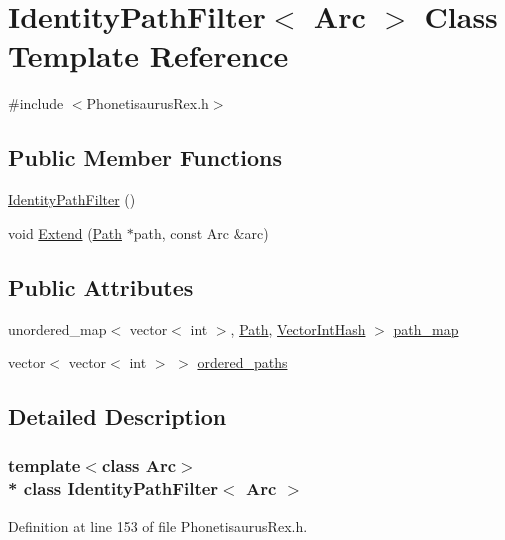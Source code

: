 \hypertarget{class_identity_path_filter}{}\section{Identity\+Path\+Filter$<$ Arc $>$ Class Template Reference}
\label{class_identity_path_filter}


{\ttfamily \#include $<$Phonetisaurus\+Rex.\+h$>$}

\subsection*{Public Member Functions}
\begin{DoxyCompactItemize}
\item 
\hyperlink{class_identity_path_filter_ad3798c4949207eb14477c2c6d4746e51}{Identity\+Path\+Filter} ()
\item 
void \hyperlink{class_identity_path_filter_a3c9d3935c06834a421d6de41c5276208}{Extend} (\hyperlink{struct_path}{Path} $\ast$path, const Arc \&arc)
\end{DoxyCompactItemize}
\subsection*{Public Attributes}
\begin{DoxyCompactItemize}
\item 
unordered\+\_\+map$<$ vector$<$ int $>$, \hyperlink{struct_path}{Path}, \hyperlink{struct_vector_int_hash}{Vector\+Int\+Hash} $>$ \hyperlink{class_identity_path_filter_a385113c7ceaae43ac23dfe7982cf5990}{path\+\_\+map}
\item 
vector$<$ vector$<$ int $>$ $>$ \hyperlink{class_identity_path_filter_a098380024b6d4053f84dce6e6257c04a}{ordered\+\_\+paths}
\end{DoxyCompactItemize}


\subsection{Detailed Description}
\subsubsection*{template$<$class Arc$>$\\*
class Identity\+Path\+Filter$<$ Arc $>$}



Definition at line 153 of file Phonetisaurus\+Rex.\+h.



